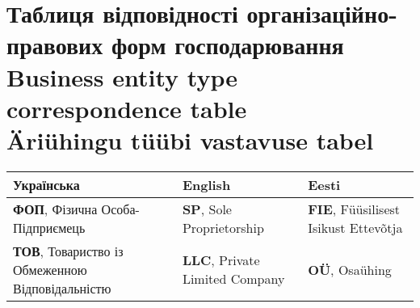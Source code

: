 %
%
%
%
%
\pagebreak
\section{Таблиця відповідності організаційно-правових форм господарювання\\Business entity type correspondence table\\Äriühingu tüübi vastavuse tabel}
\label{app:correspondence}
\begin{tabular}{ | l | l | l |}
  \hline
    \textbf{Українська} & \textbf{English} & \textbf{Eesti} \\
    \hline
    \textbf{ФОП}, Фізична Особа-Підприємець & \textbf{SP}, Sole Proprietorship & \textbf{FIE}, Füüsilisest Isikust Ettevõtja \\
    \textbf{ТОВ}, Товариство із Обмеженною Відповідальністю & \textbf{LLC}, Private Limited Company & \textbf{OÜ}, Osaühing \\
  \hline
\end{tabular}
